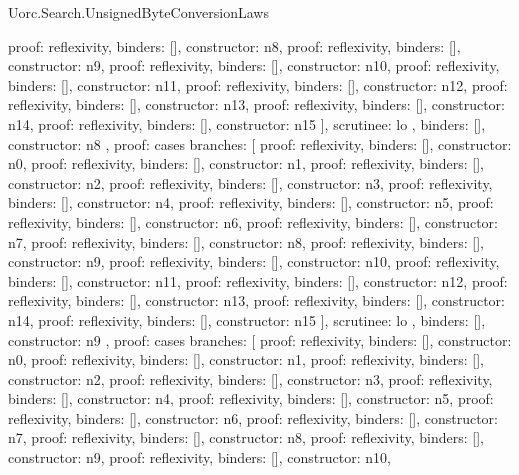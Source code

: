 \begin{lexlean}{Uorc.Search.UnsignedByteConversionLaws}
\begin{semanticmodule}
{{{{            {proof: reflexivity{}, binders: [], constructor: n8},
            {proof: reflexivity{}, binders: [], constructor: n9},
            {proof: reflexivity{}, binders: [], constructor: n10},
            {proof: reflexivity{}, binders: [], constructor: n11},
            {proof: reflexivity{}, binders: [], constructor: n12},
            {proof: reflexivity{}, binders: [], constructor: n13},
            {proof: reflexivity{}, binders: [], constructor: n14},
            {proof: reflexivity{}, binders: [], constructor: n15}
          ],
          scrutinee: lo
        },
        binders: [],
        constructor: n8
      },
      {
        proof: cases{
          branches: [
            {proof: reflexivity{}, binders: [], constructor: n0},
            {proof: reflexivity{}, binders: [], constructor: n1},
            {proof: reflexivity{}, binders: [], constructor: n2},
            {proof: reflexivity{}, binders: [], constructor: n3},
            {proof: reflexivity{}, binders: [], constructor: n4},
            {proof: reflexivity{}, binders: [], constructor: n5},
            {proof: reflexivity{}, binders: [], constructor: n6},
            {proof: reflexivity{}, binders: [], constructor: n7},
            {proof: reflexivity{}, binders: [], constructor: n8},
            {proof: reflexivity{}, binders: [], constructor: n9},
            {proof: reflexivity{}, binders: [], constructor: n10},
            {proof: reflexivity{}, binders: [], constructor: n11},
            {proof: reflexivity{}, binders: [], constructor: n12},
            {proof: reflexivity{}, binders: [], constructor: n13},
            {proof: reflexivity{}, binders: [], constructor: n14},
            {proof: reflexivity{}, binders: [], constructor: n15}
          ],
          scrutinee: lo
        },
        binders: [],
        constructor: n9
      },
      {
        proof: cases{
          branches: [
            {proof: reflexivity{}, binders: [], constructor: n0},
            {proof: reflexivity{}, binders: [], constructor: n1},
            {proof: reflexivity{}, binders: [], constructor: n2},
            {proof: reflexivity{}, binders: [], constructor: n3},
            {proof: reflexivity{}, binders: [], constructor: n4},
            {proof: reflexivity{}, binders: [], constructor: n5},
            {proof: reflexivity{}, binders: [], constructor: n6},
            {proof: reflexivity{}, binders: [], constructor: n7},
            {proof: reflexivity{}, binders: [], constructor: n8},
            {proof: reflexivity{}, binders: [], constructor: n9},
            {proof: reflexivity{}, binders: [], constructor: n10},
}}}}
\end{semanticmodule}
\end{lexlean}

